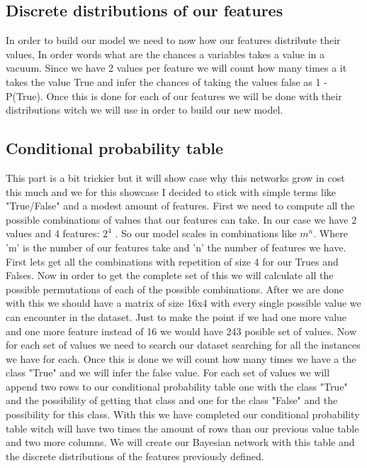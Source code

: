 \documentclass{article} %
\begin{document}
\subsection{Discrete distributions of our features}
In order to build our model we need to now how our features distribute their values, In order words what are the chances a variables takes a value in a vacuum. Since we have 2 values per feature we will count how many times a it takes the value True and infer the chances of taking the values false as 1 - P(True). Once this is done for each of our features we will be done with their distributions witch we will use in order to build our new model.
\subsection{Conditional probability table}
This part is a bit trickier but it will show case why this networks grow in cost this much and we for this showcase I decided to stick with simple terms like "True/False" and a modest amount of features.
\bigskip
First we need to compute all the possible combinations of values that our features can take. In our case  we have 2 values and 4 features: $2^{4}$ . So our model scales in combinations like $m^{n}$. Where 'm' is the number of our features take and 'n' the number of features we have.
\bigskip
First lets get all the combinations with repetition of size 4 for our Trues and Falses. Now in order to get the complete set of this we will calculate all the possible permutations of each of the possible combinations.
After we are done with this we should have a matrix of size 16x4 with every single possible value we can encounter in the dataset. Just to make the point if we had one more value and one more feature instead of 16 we would have 243 posible set of values.
\bigskip
Now for each set of values we need to search our dataset searching for all the instances we have for each. Once this is done we will count how many times we have a the class "True" and we will infer the false value. For each set of values we will append two rows to our conditional probability table one with the class "True" and the possibility of getting that class and one for the class "False" and the possibility for this class.
\bigskip
With this we have completed our conditional probability table witch will have two times the amount of rows than our previous value table and two more columns.
We will create our Bayesian network with this table and the discrete distributions of the features previously defined.
\end{document}
